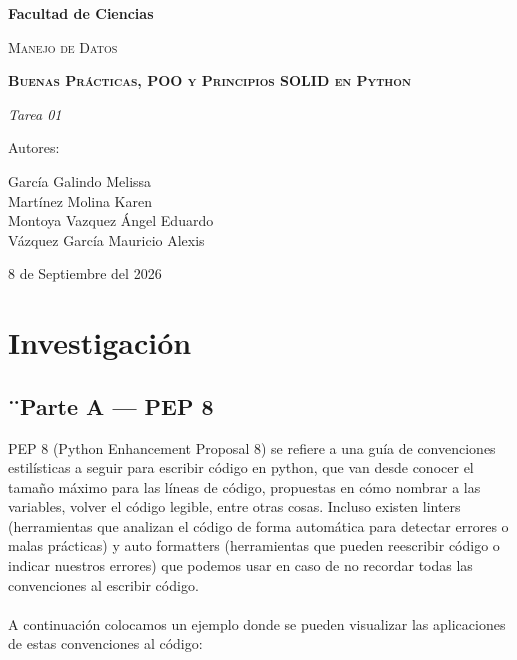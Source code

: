 \documentclass{article}
\begin{document}
    \begin{titlepage}
        \centering
        {\bfseries\LARGE Facultad de Ciencias \par}
        \vspace{1cm}
        {\scshape\Large Manejo de Datos \par}
        \vspace{3cm}
        {\bfseries\scshape\Huge Buenas Pr\'acticas, POO y Principios SOLID en Python \par}
        \vspace{3cm}
        {\itshape\Large Tarea 01 \par}
        \vfill
        {\Large Autores: \par}
        {\Large García Galindo Melissa\\    Martínez Molina  Karen\\    Montoya Vazquez Ángel Eduardo \\Vázquez García Mauricio Alexis \par}
        \vfill
        {\Large 8 de Septiembre del 2026 \par}
    \end{titlepage}
    \newpage
    \section{Investigaci\'on}
		\subsection{¨Parte A --- PEP 8}
    
    	PEP 8 (Python Enhancement Proposal 8) se refiere a una guía de convenciones estilísticas a seguir para escribir código en 
		python, que van desde conocer el tamaño máximo para las líneas de código, propuestas en cómo nombrar a las variables, 
		volver el código legible, entre otras cosas. Incluso existen linters (herramientas que analizan el código de forma 
		automática para detectar errores o malas prácticas) y auto formatters (herramientas que pueden reescribir código o 
		indicar nuestros errores) que podemos usar en caso de no recordar todas las convenciones al escribir código.\\ \\
    	A continuación colocamos un ejemplo donde se pueden visualizar las aplicaciones de estas convenciones al código:


\end{document}
